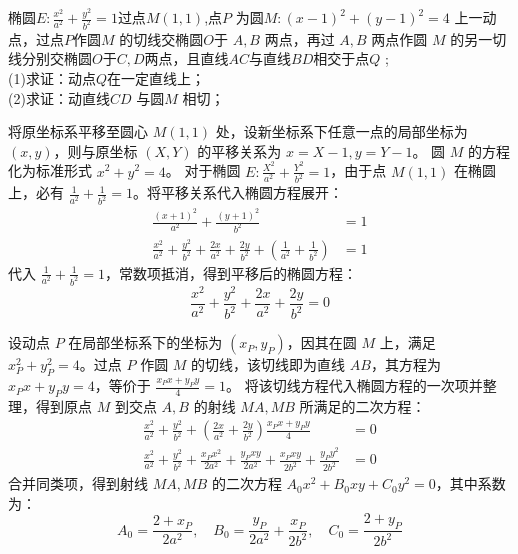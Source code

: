 \begin{exercise}
椭圆$E:\frac{x^2}{a^2}+\frac{y^2}{b^2}=1$过点$M(1,1)$,点$P$ 为圆$M:(x-1)^2+(y-1)^2=4$ 上一动点，过点$P$作圆$M$ 的切线交椭圆$O$于 $A,B$ 两点，再过 $A,B$ 两点作圆 $M$ 的另一切线分别交椭圆$O$于$C,D$两点，且直线$AC$与直线$BD$相交于点$Q$ ;\\
(1)求证：动点$Q$在一定直线上；\\
(2)求证：动直线$CD$ 与圆$M$ 相切；
\end{exercise}
\begin{solution}
将原坐标系平移至圆心 $M(1,1)$ 处，设新坐标系下任意一点的局部坐标为 $(x, y)$，则与原坐标 $(X, Y)$ 的平移关系为 $x = X - 1, y = Y - 1$。
圆 $M$ 的方程化为标准形式 $x^2 + y^2 = 4$。
对于椭圆 $E: \frac{X^2}{a^2} + \frac{Y^2}{b^2} = 1$，由于点 $M(1,1)$ 在椭圆上，必有 $\frac{1}{a^2} + \frac{1}{b^2} = 1$。将平移关系代入椭圆方程展开：
\begin{align*}
\frac{(x+1)^2}{a^2} + \frac{(y+1)^2}{b^2} &= 1 \\
\frac{x^2}{a^2} + \frac{y^2}{b^2} + \frac{2x}{a^2} + \frac{2y}{b^2} + \left(\frac{1}{a^2} + \frac{1}{b^2}\right) &= 1
\end{align*}
代入 $\frac{1}{a^2} + \frac{1}{b^2} = 1$，常数项抵消，得到平移后的椭圆方程：
$$\frac{x^2}{a^2} + \frac{y^2}{b^2} + \frac{2x}{a^2} + \frac{2y}{b^2} = 0$$

设动点 $P$ 在局部坐标系下的坐标为 $(x_P, y_P)$，因其在圆 $M$ 上，满足 $x_P^2 + y_P^2 = 4$。过点 $P$ 作圆 $M$ 的切线，该切线即为直线 $AB$，其方程为 $x_P x + y_P y = 4$，等价于 $\frac{x_P x + y_P y}{4} = 1$。
将该切线方程代入椭圆方程的一次项并整理，得到原点 $M$ 到交点 $A, B$ 的射线 $MA, MB$ 所满足的二次方程：
\begin{align*}
\frac{x^2}{a^2} + \frac{y^2}{b^2} + \left(\frac{2x}{a^2} + \frac{2y}{b^2}\right) \frac{x_P x + y_P y}{4} &= 0 \\
\frac{x^2}{a^2} + \frac{y^2}{b^2} + \frac{x_P x^2}{2a^2} + \frac{y_P xy}{2a^2} + \frac{x_P xy}{2b^2} + \frac{y_P y^2}{2b^2} &= 0
\end{align*}
合并同类项，得到射线 $MA, MB$ 的二次方程 $A_0 x^2 + B_0 xy + C_0 y^2 = 0$，其中系数为：
$$A_0 = \frac{2+x_P}{2a^2}, \quad B_0 = \frac{y_P}{2a^2} + \frac{x_P}{2b^2}, \quad C_0 = \frac{2+y_P}{2b^2}$$


\end{solution}
